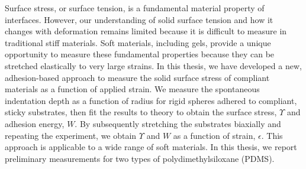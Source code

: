 


Surface stress, or surface tension, is a fundamental material property of interfaces. However, our understanding of solid surface tension and how it changes with deformation remains limited because it is difficult to measure in traditional stiff materials. Soft materials, including gels, provide a unique opportunity to measure these fundamental properties because they can be stretched elastically to very large strains. In this thesis, we have developed a new, adhesion-based approach to measure the solid surface stress of compliant materials as a function of applied strain. We measure the spontaneous indentation depth as a function of radius for rigid spheres adhered to compliant, sticky substrates, then fit the results to theory to obtain the surface stress, $ \Upsilon $ and adhesion energy, $ W $. By subsequently stretching the substrates biaxially and repeating the experiment, we obtain $ \Upsilon $ and $ W $ as a function of strain, $ \epsilon $. This approach is applicable to a wide range of soft materials. In this thesis, we report preliminary measurements for two types of polydimethylsiloxane (PDMS). 